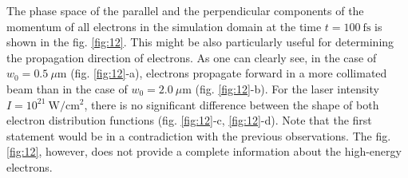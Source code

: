 The phase space of the parallel and the perpendicular components of the momentum of all electrons in the simulation domain at the time $ t = 100 \ \mathrm{fs} $ is shown in the fig. \ref{fig:12}. This might be also particularly useful for determining the propagation direction of electrons. As one can clearly see, in the case of $ w_0 = 0.5 \ \mu\mathrm{m} $ (fig. \ref{fig:12}-a), electrons propagate forward in a more collimated beam than in the case of $ w_0 = 2.0 \ \mu\mathrm{m} $ (fig. \ref{fig:12}-b). For the laser intensity $ I = 10^{21} \ \mathrm{W/cm^2} $, there is no significant difference between the shape of both electron distribution functions (fig. \ref{fig:12}-c, \ref{fig:12}-d). Note that the first statement would be in a contradiction with the previous observations. The fig. \ref{fig:12}, however, does not provide a complete information about the high-energy electrons.

